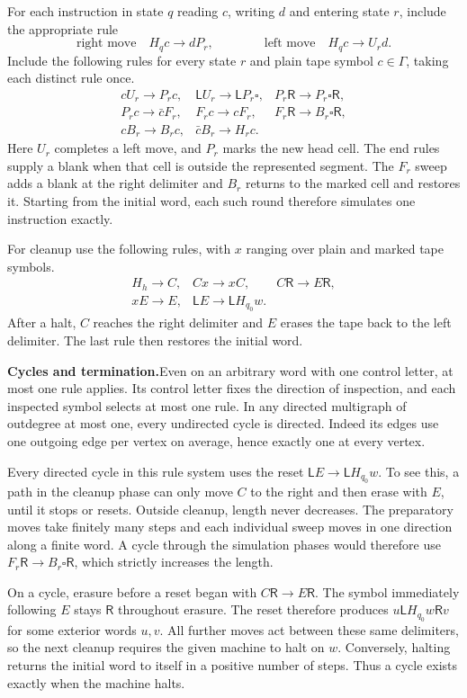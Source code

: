 \documentclass[11pt,a4paper]{article}
\newcommand{\Ld}{\mathsf{L}}
\newcommand{\Rd}{\mathsf{R}}
\newcommand{\blank}{\square}
\newcommand{\head}[1]{\par\noindent\textbf{#1}\enspace}
\begin{document}
For each instruction in state $q$ reading $c$, writing $d$ and entering state $r$, include the
appropriate rule
\[
  \text{right move}\quad H_qc\to dP_r,\qquad\qquad \text{left move}\quad H_qc\to U_rd.
\]
Include the following rules for every state $r$ and plain tape symbol $c\in\Gamma$, taking each
distinct rule once.
\[
  \begin{array}{lll}
    cU_r\to P_rc, & \Ld U_r\to \Ld P_r\blank, & P_r\Rd\to P_r\blank\Rd,\\[3pt]
    P_rc\to \bar cF_r, & F_rc\to cF_r, & F_r\Rd\to B_r\blank\Rd,\\[3pt]
    cB_r\to B_rc, & \bar cB_r\to H_rc. &
  \end{array}
\]
Here $U_r$ completes a left move, and $P_r$ marks the new head cell. The end rules supply a blank
when that cell is outside the represented segment. The $F_r$ sweep adds a blank at the right
delimiter and $B_r$ returns to the marked cell and restores it. Starting from the initial word,
each such round therefore simulates one instruction exactly.

For cleanup use the following rules, with $x$ ranging over plain and marked tape symbols.
\[
  \begin{array}{lll}
    H_h\to C, & Cx\to xC, & C\Rd\to E\Rd,\\[3pt]
    xE\to E, & \Ld E\to \Ld H_{q_0}w. &
  \end{array}
\]
After a halt, $C$ reaches the right delimiter and $E$ erases the tape back to the left delimiter.
The last rule then restores the initial word.

\head{Cycles and termination.}Even on an arbitrary word with one control letter, at most one rule
applies. Its control letter fixes the direction of inspection, and each inspected symbol selects
at most one rule. In any directed multigraph of outdegree at most one, every undirected cycle is
directed. Indeed its edges use one outgoing edge per vertex on average, hence exactly one at
every vertex.

Every directed cycle in this rule system uses the reset $\Ld E\to \Ld H_{q_0}w$. To see this, a
path in the cleanup phase can only move $C$ to the right and then erase with $E$, until it stops
or resets. Outside cleanup, length never decreases. The preparatory moves take finitely many
steps and each individual sweep moves in one direction along a finite word. A cycle through the
simulation phases would therefore use $F_r\Rd\to B_r\blank\Rd$, which strictly increases the
length.

On a cycle, erasure before a reset began with $C\Rd\to E\Rd$. The symbol immediately following
$E$ stays $\Rd$ throughout erasure. The reset therefore produces $u\Ld H_{q_0}w\Rd v$ for some
exterior words $u,v$. All further moves act between these same delimiters, so the next cleanup
requires the given machine to halt on $w$. Conversely, halting returns the initial word to
itself in a positive number of steps. Thus a cycle exists exactly when the machine halts.
\end{document}

